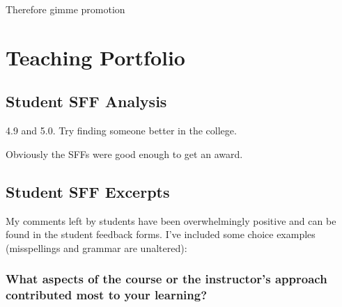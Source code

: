 \documentclass[]{article}
\begin{document}
Therefore gimme promotion

\section{Teaching Portfolio}


\subsection{Student SFF Analysis}


4.9 and 5.0.  
Try finding someone better in the college.

Obviously the SFFs were good enough to get an award.

\subsection{Student SFF Excerpts}

My comments left by students have been overwhelmingly positive and can be found in the student feedback forms.
I've included some choice examples (misspellings and grammar are unaltered):

\subsubsection{What aspects of the course or the instructor’s approach contributed most to your learning?}
\end{document}
